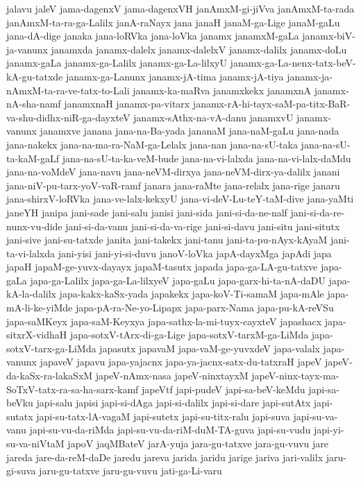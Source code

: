 {jalavu
jaleV
jama-dagenxV
jama-dagenxVH
janAmxM-gi-jiVva
janAmxM-ta-rada
janAmxM-ta-ra-ga-Lalilx
janA-raNayx
jana
janaH
janaM-ga-Lige
janaM-gaLu
jana-dA-dige
janaka
jana-loRVka
jana-loVka
janamx
janamxM-gaLa
janamx-biV-ja-vanunx
janamxda
janamx-dalelx
janamx-dalelxV
janamx-dalilx
janamx-doLu
janamx-gaLa
janamx-ga-Lalilx
janamx-ga-La-lilxyU
janamx-ga-La-nenx-tatx-beV-kA-gu-tatxde
janamx-ga-Lanunx
janamx-jA-tima
janamx-jA-tiya
janamx-ja-nAmxM-ta-ra-ve-tatx-to-Lali
janamx-ka-maRva
janamxkekx
janamxnA
janamx-nA-sha-namf
janamxnaH
janamx-pa-vitarx
janamx-rA-hi-tayx-saM-pa-titx-BaR-va-shu-didhx-niR-ga-dayxteV
janamx-sAthx-na-vA-danu
janamxvU
janamx-vanunx
janamxve
janana
jana-na-Ba-yada
jananaM
jana-naM-gaLu
jana-nada
jana-nakekx
jana-na-ma-ra-NaM-ga-Lelalx
jana-nan
jana-na-sU-taka
jana-na-sU-ta-kaM-gaLf
jana-na-sU-ta-ka-veM-bude
jana-na-vi-lalxda
jana-na-vi-lalx-daMdu
jana-na-voMdeV
jana-navu
jana-neVM-dirxya
jana-neVM-dirx-ya-dalilx
janani
jana-niV-pu-tarx-yoV-vaR-ramf
janara
jana-raMte
jana-relalx
jana-rige
janaru
jana-shirxV-loRVka
jana-ve-lalx-kekxyU
jana-vi-deV-Lu-teY-taM-dive
jana-yaMti
janeYH
janipa
jani-sade
jani-salu
janisi
jani-sida
jani-si-da-ne-nalf
jani-si-da-re-nunx-vu-dide
jani-si-da-vanu
jani-si-da-va-rige
jani-si-davu
jani-situ
jani-situtx
jani-sive
jani-su-tatxde
janita
jani-takekx
jani-tanu
jani-ta-pu-nAyx-kAyaM
jani-ta-vi-lalxda
jani-yisi
jani-yi-si-duvu
janoV-loVka
japA-dayxMga
japAdi
japa
japaH
japaM-ge-yuvx-dayayx
japaM-tasutx
japada
japa-ga-LA-gu-tatxve
japa-gaLa
japa-ga-Lalilx
japa-ga-La-lilxyeV
japa-gaLu
japa-garx-hi-ta-nA-daDU
japa-kA-la-dalilx
japa-kakx-kaSx-yada
japakekx
japa-koV-Ti-samaM
japa-mAle
japa-mA-li-ke-yiMde
japa-pA-ra-Ne-yo-Lipapx
japa-parx-Nama
japa-pu-kA-reVSu
japa-saMKeyx
japa-saM-Keyxya
japa-sathx-la-mi-tuyx-cayxteV
japashacx
japa-sitxrX-vidhaH
japa-sotxV-tArx-di-ga-Lige
japa-sotxV-tarxM-ga-LiMda
japa-sotxV-tarx-ga-LiMda
japasutx
japavaM
japa-vaM-ge-yuvxdeV
japa-valalx
japa-vanunx
japaveV
japavu
japa-yajacnx
japa-ya-jacnx-satx-du-tatxraH
japeV
japeV-da-kaSx-ra-lakaSxM
japeV-nAmx-nasa
japeV-ninxtayxM
japeV-ninx-tayx-ma-SoTxV-tatx-ra-sa-ha-sarx-kamf
japeVtf
japi-pudeV
japi-sa-beV-keMdu
japi-sa-beVku
japi-salu
japisi
japi-si-dAga
japi-si-dalilx
japi-si-dare
japi-sutAtx
japi-sutatx
japi-su-tatx-lA-vagaM
japi-sutetx
japi-su-titx-ralu
japi-suva
japi-su-va-vanu
japi-su-vu-da-riMda
japi-su-vu-da-riM-duM-TA-guva
japi-su-vudu
japi-yi-su-va-niVtaM
japoV
jaqMBateV
jarA-yuja
jara-gu-tatxve
jara-gu-vuvu
jare
jareda
jare-da-reM-daDe
jaredu
jareva
jarida
jaridu
jarige
jariva
jari-valilx
jaru-gi-suva
jaru-gu-tatxve
jaru-gu-vuvu
jati-ga-Li-varu
}
